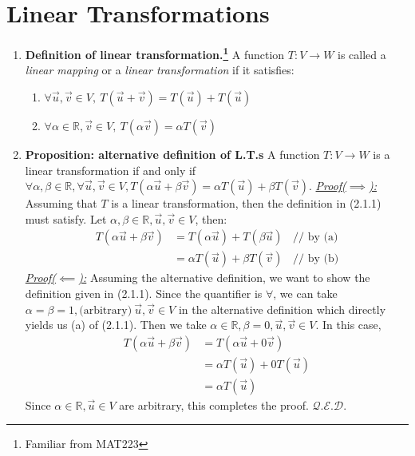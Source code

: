 \documentclass[oneside, 12pt]{book}
\newcommand{\settag}[1]{\renewcommand{\theenumi}{#1}}
\newcommand{\R}{\mathbb{R}}
\newcommand{\qed}{\hfill $\mathcal{Q}.\mathcal{E}.\mathcal{D}.$}
\newcommand{\tbf}[1]{\textbf{#1}}
\newcommand{\tit}[1]{\textit{#1}}
\begin{document}
\section{Linear Transformations}

    \begin{enumerate}
        \settag{2.1.1}
        \item \tbf{Definition of linear transformation.\footnote{Familiar from MAT223}} A function $T:V\xrightarrow{}W$ is called a \tit{linear mapping} or a \tit{linear transformation} if it satisfies:
        \begin{enumerate}
            \item $\forall \vec{u},\vec{v}\in V,~T(\vec{u} + \vec{v}) = T(\vec{u}) + T(\vec{u})$
            \item $\forall \alpha \in \R, \vec{v} \in V,~ T(\alpha\vec{v}) = \alpha T(\vec{v})$
        \end{enumerate}
        
        \settag{2.1.2}
        \item \tbf{Proposition: alternative definition of L.T.s} A function $T:V\xrightarrow{}W$ is a linear transformation if and only if $\forall \alpha,\beta \in \R, \forall \vec{u}, \vec{v} \in V, T(\alpha \vec{u}+\beta \vec{v})=\alpha T(\vec{u}) + \beta T(\vec{v})$.\newline
        \tit{\underline{Proof($\implies$):}}\newline
        Assuming that $T$ is a linear transformation, then the definition in (2.1.1) must satisfy. Let $\alpha,\beta \in \R, \vec{u},\vec{v}\in V$, then: 
        \begin{align*}
            T(\alpha\vec{u} + \beta\vec{v}) &= T(\alpha\vec{u}) + T(\beta\vec{u})~~~~\text{// by (a)} \\
            &= \alpha T(\vec{u}) + \beta T(\vec{v})~~~~\text{// by (b)}
        \end{align*}
        \tit{\underline{Proof($\impliedby$):}}\newline
        Assuming the alternative definition, we want to show the definition given in (2.1.1). Since the quantifier is $\forall$, we can take $\alpha = \beta  =1, \text{(arbitrary)}~\vec{u},\vec{v}\in V$ in the alternative definition which directly yields us (a) of (2.1.1). Then we take $\alpha \in \R, \beta =0, \vec{u}, \vec{v}\in V$. In this case, 
        \begin{align*}
            T(\alpha\vec{u} + \beta\vec{v}) &= T(\alpha\vec{u} + 0\vec{v}) \\
            &= \alpha T(\vec{u}) + 0T(\vec{u}) \\
            &= \alpha T(\vec{u})
        \end{align*}
        Since $\alpha\in \R, \vec{u}\in V$ are arbitrary, this completes the proof. \qed
        
    \end{enumerate}
    
    
\end{document}
